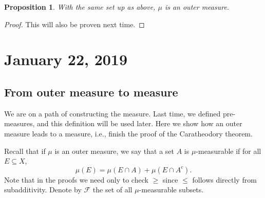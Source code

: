 \documentclass{article}
\newtheorem{proposition}[theorem]{Proposition}
\theoremstyle{definition}
\begin{document}
\begin{proposition}
With the same set up as above, $\mu$ is an outer measure. 
\end{proposition}
\begin{proof}
	This will also be proven next time.
\end{proof}

\section{January 22, 2019}

\subsection{From outer measure to measure}

We are on a path of constructing the measure. 
Last time, we defined pre-measures, and this definition will be used later.
Here we show how an outer measure leads to a measure,
i.e., finish the proof of the Caratheodory theorem.

Recall that if $\mu$ is an outer measure, 
we say that a set \( A \) is
\(\mu\)-measurable if for all \( E \subseteq X \),
\begin{displaymath}
	\mu(E) = \mu(E \cap A) + \mu(E \cap A^c).
\end{displaymath}
Note that in the proofs we need only to check \( \geq \) since \( \leq \) follows directly
from subadditivity.
Denote by $\mathscr{F}$ the set of all $\mu$-measurable subsets.
\end{document}
